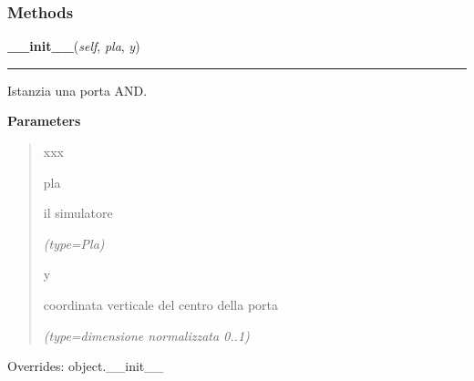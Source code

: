   \subsubsection{Methods}

    \vspace{0.5ex}

\hspace{.8\funcindent}\begin{boxedminipage}{\funcwidth}

    \raggedright \textbf{\_\_init\_\_}(\textit{self}, \textit{pla}, \textit{y})

    \vspace{-1.5ex}

    \rule{\textwidth}{0.5\fboxrule}
\setlength{\parskip}{2ex}
    Istanzia una porta AND.

\setlength{\parskip}{1ex}
      \textbf{Parameters}
      \vspace{-1ex}

      \begin{quote}
        \begin{Ventry}{xxx}

          \item[pla]

          il simulatore

            {\it (type=Pla)}

          \item[y]

          coordinata verticale del centro della porta

            {\it (type=dimensione normalizzata 0..1)}

        \end{Ventry}

      \end{quote}

      Overrides: object.\_\_init\_\_

    \end{boxedminipage}

    \label{component:And:value}

    \vspace{0.5ex}

